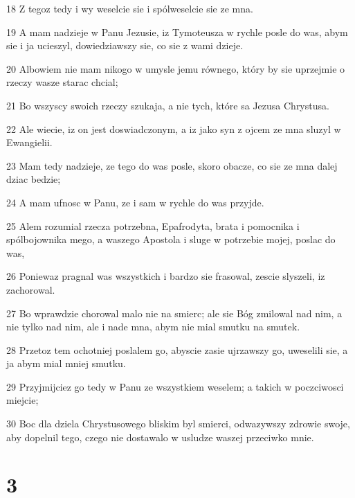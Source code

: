 \par 18 Z tegoz tedy i wy weselcie sie i spólweselcie sie ze mna.
\par 19 A mam nadzieje w Panu Jezusie, iz Tymoteusza w rychle posle do was, abym sie i ja ucieszyl, dowiedziawszy sie, co sie z wami dzieje.
\par 20 Albowiem nie mam nikogo w umysle jemu równego, który by sie uprzejmie o rzeczy wasze starac chcial;
\par 21 Bo wszyscy swoich rzeczy szukaja, a nie tych, które sa Jezusa Chrystusa.
\par 22 Ale wiecie, iz on jest doswiadczonym, a iz jako syn z ojcem ze mna sluzyl w Ewangielii.
\par 23 Mam tedy nadzieje, ze tego do was posle, skoro obacze, co sie ze mna dalej dziac bedzie;
\par 24 A mam ufnosc w Panu, ze i sam w rychle do was przyjde.
\par 25 Alem rozumial rzecza potrzebna, Epafrodyta, brata i pomocnika i spólbojownika mego, a waszego Apostola i sluge w potrzebie mojej, poslac do was,
\par 26 Poniewaz pragnal was wszystkich i bardzo sie frasowal, zescie slyszeli, iz zachorowal.
\par 27 Bo wprawdzie chorowal malo nie na smierc; ale sie Bóg zmilowal nad nim, a nie tylko nad nim, ale i nade mna, abym nie mial smutku na smutek.
\par 28 Przetoz tem ochotniej poslalem go, abyscie zasie ujrzawszy go, uweselili sie, a ja abym mial mniej smutku.
\par 29 Przyjmijciez go tedy w Panu ze wszystkiem weselem; a takich w poczciwosci miejcie;
\par 30 Boc dla dziela Chrystusowego bliskim byl smierci, odwazywszy zdrowie swoje, aby dopelnil tego, czego nie dostawalo w usludze waszej przeciwko mnie.

\chapter{3}

